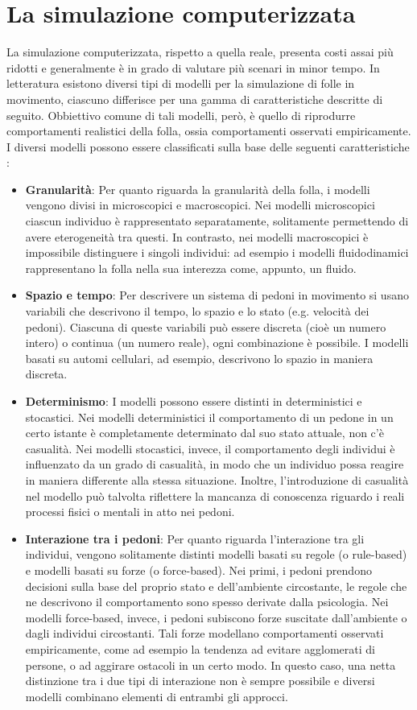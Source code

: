 \documentclass[12pt,a4paper,openright,oneside]{book}
\begin{document}
\section{La simulazione computerizzata}
La simulazione computerizzata, rispetto a quella reale, presenta costi assai più ridotti e generalmente è in grado di valutare più scenari in minor tempo. In letteratura esistono diversi tipi di modelli per la simulazione di folle in movimento, ciascuno differisce per una gamma di caratteristiche descritte di seguito. Obbiettivo comune di tali modelli, però, è quello di riprodurre comportamenti realistici della folla, ossia comportamenti osservati empiricamente. I diversi modelli possono essere classificati sulla base delle seguenti caratteristiche \cite{SchadschneiderEvacuationDynamics2009}:
\begin{itemize}
 \item \textbf{Granularità}: Per quanto riguarda la granularità della folla, i modelli vengono divisi in microscopici e macroscopici. Nei modelli microscopici ciascun individuo è rappresentato separatamente, solitamente permettendo di avere eterogeneità tra questi. In contrasto, nei modelli macroscopici è impossibile distinguere i singoli individui: ad esempio i modelli fluidodinamici rappresentano la folla nella sua interezza come, appunto, un fluido.
 \item \textbf{Spazio e tempo}: Per descrivere un sistema di pedoni in movimento si usano variabili che descrivono il tempo, lo spazio e lo stato (e.g. velocità dei pedoni). Ciascuna di queste variabili può essere discreta (cioè un numero intero) o continua (un numero reale), ogni combinazione è possibile. I modelli basati su automi cellulari, ad esempio, descrivono lo spazio in maniera discreta.
 \item \textbf{Determinismo}: I modelli possono essere distinti in deterministici e stocastici. Nei modelli deterministici il comportamento di un pedone in un certo istante è completamente determinato dal suo stato attuale, non c'è casualità. Nei modelli stocastici, invece, il comportamento degli individui è influenzato da un grado di casualità, in modo che un individuo possa reagire in maniera differente alla stessa situazione. Inoltre, l'introduzione di casualità nel modello può talvolta riflettere la mancanza di conoscenza riguardo i reali processi fisici o mentali in atto nei pedoni.
 \item \textbf{Interazione tra i pedoni}: Per quanto riguarda l'interazione tra gli individui, vengono solitamente distinti modelli basati su regole (o rule-based) e modelli basati su forze (o force-based). Nei primi, i pedoni prendono decisioni sulla base del proprio stato e dell'ambiente circostante, le regole che ne descrivono il comportamento sono spesso derivate dalla psicologia. Nei modelli force-based, invece, i pedoni subiscono forze suscitate dall'ambiente o dagli individui circostanti. Tali forze modellano comportamenti osservati empiricamente, come ad esempio la tendenza ad evitare agglomerati di persone, o ad aggirare ostacoli in un certo modo. 
 In questo caso, una netta distinzione tra i due tipi di interazione non è sempre possibile e diversi modelli combinano elementi di entrambi gli approcci.
\end{itemize}
\end{document}
